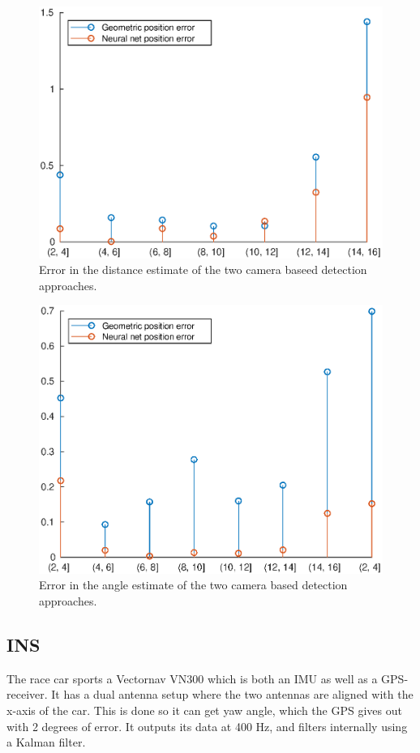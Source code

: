 \begin{figure}
    \centering
    \includegraphics[width=0.8\linewidth]{0_Images/3_Theory/camDetection/rErrorCamera.eps}
    \caption[Error in the distance estimate of the two camera based detection approaches.]
    {Error in the distance estimate of the two camera baseed detection approaches.}
    \label{Fig:rErrorCamera}
\end{figure}

\begin{figure}
    \centering
    \includegraphics[width=0.8\linewidth]{0_Images/3_Theory/camDetection/psiErrorCamera.eps}
    \caption[Error in the angle estimate of the two camera based detection approaches.]
    {Error in the angle estimate of the two camera based detection approaches.}
    \label{Fig:psiErrorCamera}
\end{figure}

\subsection{INS}
The race car sports a Vectornav VN300 which is both an IMU as well as a GPS-receiver. It has a dual antenna setup where the two antennas are aligned with the x-axis of the car. This is done so it can get yaw angle, which the GPS gives out with 2 degrees of error. It outputs its data at 400 Hz, and filters internally using a Kalman filter. 

